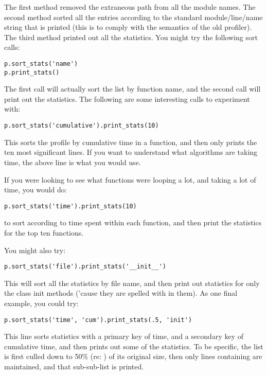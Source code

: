The first method removed the extraneous path from all the module
names. The second method sorted all the entries according to the
standard module/line/name string that is printed (this is to comply
with the semantics of the old profiler).  The third method printed out
all the statistics.  You might try the following sort calls:

\begin{verbatim}
p.sort_stats('name')
p.print_stats()
\end{verbatim}

The first call will actually sort the list by function name, and the
second call will print out the statistics.  The following are some
interesting calls to experiment with:

\begin{verbatim}
p.sort_stats('cumulative').print_stats(10)
\end{verbatim}

This sorts the profile by cumulative time in a function, and then only
prints the ten most significant lines.  If you want to understand what
algorithms are taking time, the above line is what you would use.

If you were looking to see what functions were looping a lot, and
taking a lot of time, you would do:

\begin{verbatim}
p.sort_stats('time').print_stats(10)
\end{verbatim}

to sort according to time spent within each function, and then print
the statistics for the top ten functions.

You might also try:

\begin{verbatim}
p.sort_stats('file').print_stats('__init__')
\end{verbatim}

This will sort all the statistics by file name, and then print out
statistics for only the class init methods ('cause they are spelled
with  in them).  As one final example, you could try:

\begin{verbatim}
p.sort_stats('time', 'cum').print_stats(.5, 'init')
\end{verbatim}

This line sorts statistics with a primary key of time, and a secondary
key of cumulative time, and then prints out some of the statistics.
To be specific, the list is first culled down to 50\% (re: )
of its original size, then only lines containing  are
maintained, and that sub-sub-list is printed.

